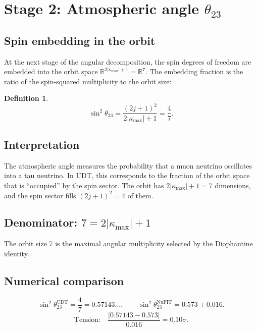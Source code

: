 \documentclass[11pt,letterpaper]{article}
\newtheorem{definition}[theorem]{Definition}
\numberwithin{equation}{section}
\begin{document}
\section{Stage 2: Atmospheric angle $\theta_{23}$}
\label{sec:theta23}

\subsection{Spin embedding in the orbit}

At the next stage of the angular decomposition, the spin degrees of freedom
are embedded into the orbit space $\mathbb{R}^{2|\kappa_\mathrm{max}|+1} = \mathbb{R}^7$.
The embedding fraction is the ratio of the spin-squared multiplicity to the
orbit size:

\begin{definition}
\begin{equation}
\label{eq:sin2_23}
\boxed{
  \sin^2\theta_{23} = \frac{(2j+1)^2}{2|\kappa_\mathrm{max}|+1} = \frac{4}{7}.
}
\end{equation}
\end{definition}

\subsection{Interpretation}

The atmospheric angle measures the probability that a muon neutrino
oscillates into a tau neutrino. In UDT, this corresponds to the fraction
of the orbit space that is ``occupied'' by the spin sector. The orbit has
$2|\kappa_\mathrm{max}|+1 = 7$ dimensions, and the spin sector fills
$(2j+1)^2 = 4$ of them.

\subsection{Denominator: $7 = 2|\kappa_\mathrm{max}|+1$}

The orbit size 7 is the maximal angular multiplicity selected by the
Diophantine identity.

\subsection{Numerical comparison}

\begin{equation}
  \sin^2\theta_{23}^\mathrm{UDT} = \frac{4}{7} = 0.57143\ldots, \qquad
  \sin^2\theta_{23}^\mathrm{NuFIT} = 0.573 \pm 0.016.
\end{equation}
\begin{equation}
  \text{Tension:}\quad
  \frac{|0.57143 - 0.573|}{0.016} = 0.10\sigma.
\end{equation}
\end{document}
